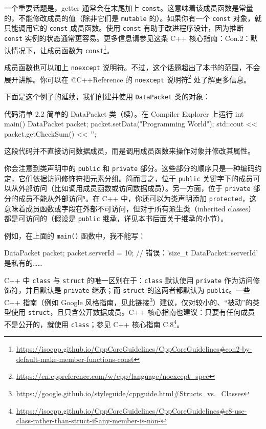 一个重要话题是，getter 通常会在末尾加上 \texttt{const}。这意味着该成员函数是常量的，不能修改成员的值（除非它们是 \texttt{mutable} 的）。如果你有一个 \texttt{const} 对象，就只能调用它的 \texttt{const} 成员函数。使用 \texttt{const} 有助于改进程序设计，因为推断 \texttt{const} 实例的状态通常更容易。更多信息请参见这条 C++ 核心指南：Con.2：默认情况下，让成员函数为 \texttt{const}\footnote{\url{https://isocpp.github.io/CppCoreGuidelines/CppCoreGuidelines\#con2-by-default-make-member-functions-const}}。

\begin{myInfoBox}
成员函数也可以加上 \texttt{noexcept} 说明符。不过，这个话题超出了本书的范围，不会展开讲解。你可以在 @C++Reference 的 \texttt{noexcept} 说明符\footnote{\url{https://en.cppreference.com/w/cpp/language/noexcept_spec}} 处了解更多信息。
\end{myInfoBox}


下面是这个例子的延续，我们创建并使用 \texttt{DataPacket} 类的对象：

\begin{codeboxt}[cpp]{代码清单 2.2 简单的 DataPacket 类（续）。在 Compiler Explorer 上运行}
int main() {
DataPacket packet;
packet.setData("Programming World");
std::cout << packet.getCheckSum() << '\n';
}
\end{codeboxt}

这段代码并不直接访问数据成员，而是调用成员函数来操作对象并修改其属性。

你会注意到类声明中的 \texttt{public} 和 \texttt{private} 部分。这些部分的顺序只是一种编码约定，它们依据访问修饰符把元素分组。简而言之，位于 \texttt{public} 关键字下的成员可以从外部访问（比如调用成员函数或访问数据成员）。另一方面，位于 \texttt{private} 部分的成员不能从外部访问⁵。在 C++ 中，你还可以为类声明添加 \texttt{protected}，这意味着成员函数或字段在外部不可访问，但对于所有派生类（inherited classes）都是可访问的（假设是 \texttt{public} 继承，详见本书后面关于继承的小节）。


例如，在上面的 \texttt{main()} 函数中，我不能写：

\begin{codebox}[cpp]
DataPacket packet;
packet.serverId = 10; // 错误：'size_t DataPacket::serverId' 是私有的……
\end{codebox}

\begin{myInfoBox}
C++ 中 \texttt{class} 与 \texttt{struct} 的唯一区别在于：\texttt{class} 默认使用 \texttt{private} 作为访问修饰符，并且默认是 \texttt{private} 继承；而 \texttt{struct} 的这两者都默认为 \texttt{public}。一些 C++ 指南（例如 Google 风格指南，见此链接\footnote{\url{https://google.github.io/styleguide/cppguide.html\#Structs_vs._Classes}}）建议，仅对较小的、“被动”的类型使用 \texttt{struct}，且只含公开数据成员。C++ 核心指南也建议：只要有任何成员不是公开的，就使用 \texttt{class}；参见 C++ 核心指南 C.8\footnote{\url{https://isocpp.github.io/CppCoreGuidelines/CppCoreGuidelines\#c8-use-class-rather-than-struct-if-any-member-is-non-}}。
\end{myInfoBox}


